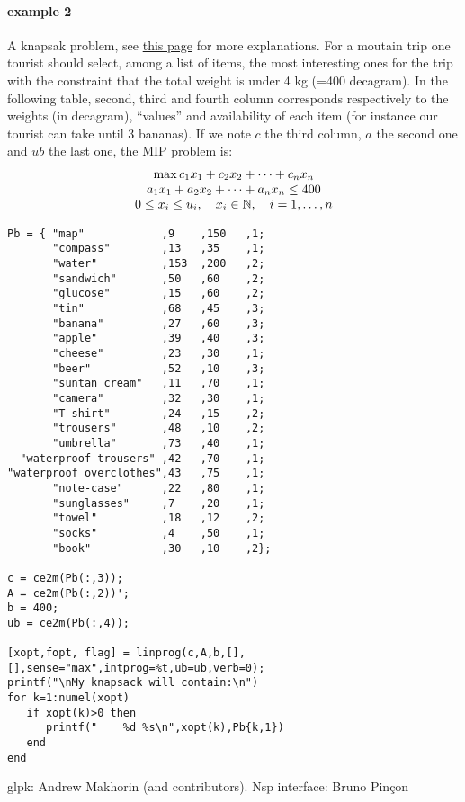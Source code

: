 \begin{examples}
\paragraph{example 2} A knapsak problem, see
\href{http://rosettacode.org/wiki/Knapsack_problem/Bounded}{this page} for more explanations.
For a moutain trip one tourist should select, among a list of items, the most interesting
ones for the trip with the constraint that the total weight is under 4 kg (=400 decagram). 
In the following table, second, third and fourth column corresponds respectively to the weights 
(in decagram),  ``values'' and availability of each item (for instance our tourist can take 
until 3 bananas). If we note $c$ the third column, $a$ the second one and $ub$ the last one, 
the MIP problem is:
$$
\begin{array}{c}
   \max c_1 x_1 + c_2 x_2 + \dots + c_n x_n\\
      a_1 x_1 + a_2 x_2 + \dots + a_n x_n \le 400\\
      0 \le x_i \le u_i, \quad x_i \in \mathbb N, \quad i = 1, \dots, n
\end{array}
$$
\begin{Verbatim}
Pb = { "map"   	        ,9    ,150   ,1;
       "compass"        ,13   ,35    ,1;
       "water" 	        ,153  ,200   ,2;
       "sandwich"       ,50   ,60    ,2;
       "glucose"        ,15   ,60    ,2;
       "tin"   	        ,68   ,45    ,3;
       "banana"         ,27   ,60    ,3;
       "apple" 	        ,39   ,40    ,3;
       "cheese"         ,23   ,30    ,1;
       "beer"  	        ,52   ,10    ,3;
       "suntan cream"   ,11   ,70    ,1;
       "camera"         ,32   ,30    ,1;
       "T-shirt"        ,24   ,15    ,2;
       "trousers"       ,48   ,10    ,2;
       "umbrella"       ,73   ,40    ,1;
  "waterproof trousers" ,42   ,70    ,1;
"waterproof overclothes",43   ,75    ,1;
       "note-case"      ,22   ,80    ,1;
       "sunglasses"     ,7    ,20    ,1;
       "towel" 	        ,18   ,12    ,2;
       "socks" 	        ,4    ,50    ,1;
       "book"  	        ,30   ,10    ,2};

c = ce2m(Pb(:,3));
A = ce2m(Pb(:,2))';
b = 400;
ub = ce2m(Pb(:,4));

[xopt,fopt, flag] = linprog(c,A,b,[],[],sense="max",intprog=%t,ub=ub,verb=0);
printf("\nMy knapsack will contain:\n")
for k=1:numel(xopt)
   if xopt(k)>0 then
      printf("    %d %s\n",xopt(k),Pb{k,1})
   end
end
\end{Verbatim}

\end{examples}

\begin{manseealso}

\end{manseealso}

\begin{authors}
 glpk: Andrew Makhorin (and contributors). Nsp interface: Bruno Pin\c{c}on
\end{authors}
